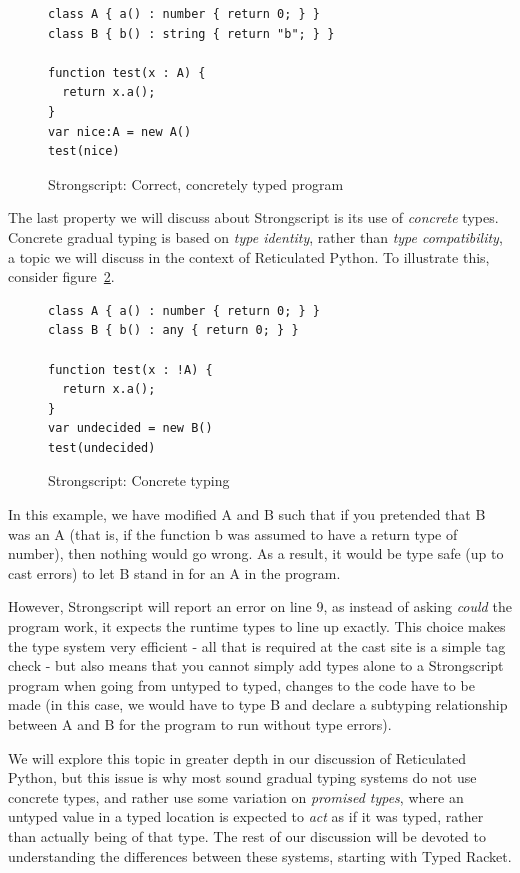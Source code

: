 \documentclass[a4paper,USenglish]{tex/lipics-v2016}
\begin{document}
\begin{figure}[h]
\begin{verbatim}
class A { a() : number { return 0; } }
class B { b() : string { return "b"; } }

function test(x : A) {
  return x.a();
}
var nice:A = new A()
test(nice)
\end{verbatim}
\caption{Strongscript: Correct, concretely typed program}
\label{fig:ssex3}
\end{figure}

The last property we will discuss about Strongscript is its use of 
\emph{concrete} types. Concrete gradual typing is based on \emph{type identity},
rather than \emph{type compatibility}, a topic we will discuss in the context of
Reticulated Python. To illustrate this, consider figure~\ref{fig:ssex4}.

\begin{figure}[h]
\begin{verbatim}
class A { a() : number { return 0; } }
class B { b() : any { return 0; } }

function test(x : !A) {
  return x.a();
}
var undecided = new B()
test(undecided)
\end{verbatim}
\caption{Strongscript: Concrete typing}
\label{fig:ssex4}
\end{figure}

In this example, we have modified A and B such that if you pretended that B
was an A (that is, if the function b was assumed to have a return type
of number), then nothing would go wrong. As a result, it would be type
safe (up to cast errors) to let B stand in for an A in the program.

However, Strongscript will report an error on line 9, as instead of asking
\emph{could} the program work, it expects the runtime types to line up exactly.
This choice makes the type system very efficient - all that is required
at the cast site is a simple tag check - but also means that you cannot simply
add types alone to a Strongscript program when going from untyped to typed,
changes to the code have to be made (in this case, we would have to type
B and declare a subtyping relationship between A and B for the program to
run without type errors).

We will explore this topic in greater depth in our discussion of Reticulated
Python, but this issue is why most sound gradual typing systems do not use
concrete types, and rather use some variation on \emph{promised types}, 
where an untyped value in a typed location is expected to \emph{act} as
if it was typed, rather than actually being of that type. The rest of our
discussion will be devoted to understanding the differences between these 
systems, starting with Typed Racket.
\end{document}
